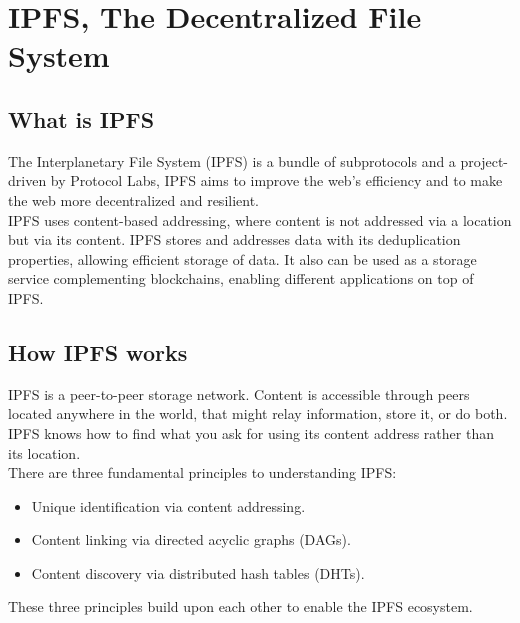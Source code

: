 
\section{IPFS, The Decentralized File System}

\subsection{What is IPFS}

The Interplanetary File System (IPFS) is a bundle of subprotocols and a project-driven by Protocol Labs, IPFS aims to improve the web’s efficiency and to make the web more decentralized and resilient. \\[-8pt]

IPFS uses content-based addressing, where content is not addressed via a location but via its content. IPFS stores and addresses data with its deduplication properties, allowing efficient storage of data. It also can be used as a storage service complementing blockchains, enabling different applications on top of IPFS. \\[-8pt]

\subsection{How IPFS works}

IPFS is a peer-to-peer storage network. Content is accessible through peers located anywhere in the world, that might relay information, store it, or do both. IPFS knows how to find what you ask for using its content address rather than its location. \\[-8pt]

\noindent
There are three fundamental principles to understanding IPFS: \\

\begin{itemize}
\item Unique identification via content addressing.
\item Content linking via directed acyclic graphs (DAGs).
\item Content discovery via distributed hash tables (DHTs).
\end{itemize}

These three principles build upon each other to enable the IPFS ecosystem. \\[-8pt]

